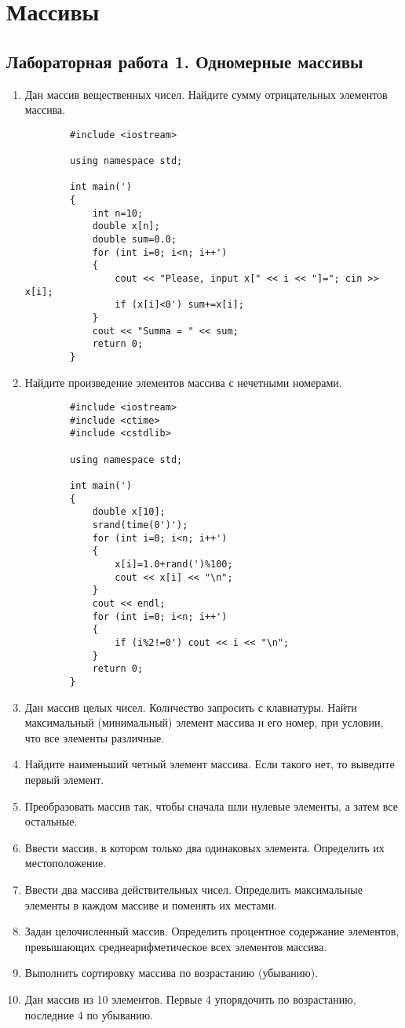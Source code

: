 \chapter{Массивы}

\section{Лабораторная работа 1. Одномерные массивы}
\begin{enumerate}[leftmargin=*]
    \item Дан массив вещественных чисел. Найдите сумму отрицательных элементов массива.
    \begin{lstlisting}
        #include <iostream>

        using namespace std;

        int main(')
        {
            int n=10;
            double x[n];
            double sum=0.0;
            for (int i=0; i<n; i++')
            {
                cout << "Please, input x[" << i << "]="; cin >> x[i];
                if (x[i]<0') sum+=x[i];
            }
            cout << "Summa = " << sum;
            return 0;
        }
    \end{lstlisting}
    \item Найдите произведение элементов массива с нечетными номерами.
    \begin{lstlisting}
        #include <iostream>
        #include <ctime>
        #include <cstdlib>

        using namespace std;

        int main(')
        {
            double x[10];
            srand(time(0')');
            for (int i=0; i<n; i++')
            {
                x[i]=1.0+rand(')%100;
                cout << x[i] << "\n";
            }
            cout << endl;
            for (int i=0; i<n; i++')
            {
                if (i%2!=0') cout << i << "\n";
            }
            return 0;
        }
    \end{lstlisting}
    \item Дан массив целых чисел. Количество запросить с клавиатуры. Найти максимальный (минимальный) элемент массива и его номер, при условии, что все элементы различные.
    \item Найдите наименьший четный элемент массива. Если такого нет, то выведите первый элемент.
    \item Преобразовать массив так, чтобы сначала шли нулевые элементы, а затем все остальные.
    \item Ввести массив, в котором только два одинаковых элемента. Определить их местоположение.
    \item Ввести два массива действительных чисел. Определить максимальные элементы в каждом массиве и поменять их местами.
    \item Задан целочисленный массив. Определить процентное содержание элементов, превышающих среднеарифметическое всех элементов массива.
    \item Выполнить сортировку массива по возрастанию (убыванию).
    \item Дан массив из 10 элементов. Первые 4 упорядочить по возрастанию, последние 4 по убыванию.
\end{enumerate}
